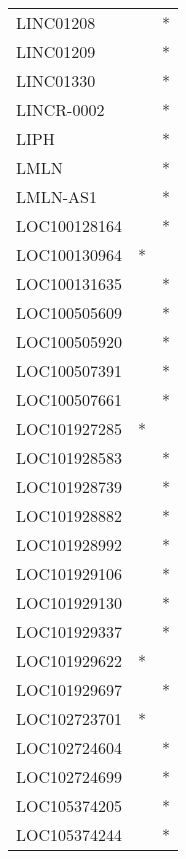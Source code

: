\begin{longtable}{lcc}
LINC01208        &                &          * \\
LINC01209        &                &          * \\
LINC01330        &                &          * \\
LINCR-0002       &                &          * \\
LIPH             &                &          * \\
LMLN             &                &          * \\
LMLN-AS1         &                &          * \\
LOC100128164     &                &          * \\
LOC100130964     &              * &            \\
LOC100131635     &                &          * \\
LOC100505609     &                &          * \\
LOC100505920     &                &          * \\
LOC100507391     &                &          * \\
LOC100507661     &                &          * \\
LOC101927285     &              * &            \\
LOC101928583     &                &          * \\
LOC101928739     &                &          * \\
LOC101928882     &                &          * \\
LOC101928992     &                &          * \\
LOC101929106     &                &          * \\
LOC101929130     &                &          * \\
LOC101929337     &                &          * \\
LOC101929622     &              * &            \\
LOC101929697     &                &          * \\
LOC102723701     &              * &            \\
LOC102724604     &                &          * \\
LOC102724699     &                &          * \\
LOC105374205     &                &          * \\
LOC105374244     &                &          * \\

\end{longtable}
